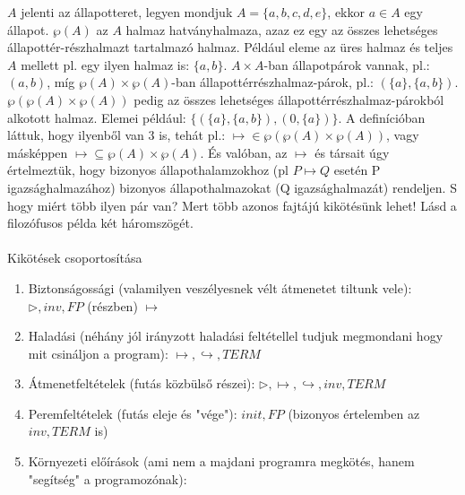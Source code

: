\documentclass{article}
\begin{document}
$A$ jelenti az állapotteret, legyen mondjuk $A = \lbrace a,b,c,d,e \rbrace$, ekkor $a \in A$ egy állapot. $\wp(A)$ az $A$ halmaz hatványhalmaza, azaz ez egy az összes lehetséges állapottér-részhalmazt tartalmazó halmaz. Például eleme az üres halmaz és teljes $A$ mellett pl. egy ilyen halmaz is: $ \lbrace a,b \rbrace$. $A \times A$-ban állapotpárok vannak, pl.: $(a,b)$, míg $\wp(A) \times \wp(A)$-ban állapottérrészhalmaz-párok, pl.: $(\lbrace a \rbrace, \lbrace a,b \rbrace)$. $\wp(\wp(A) \times \wp(A))$ pedig az összes lehetséges állapottérrészhalmaz-párokból alkotott halmaz. Elemei például: $\lbrace ( \lbrace a \rbrace, \lbrace a,b \rbrace), (0, \lbrace a \rbrace) \rbrace$. A definícióban láttuk, hogy ilyenből van 3 is, tehát pl.: $\mapsto \in \wp(\wp(A) \times \wp(A))$, vagy másképpen $\mapsto \subseteq \wp(A) \times \wp(A)$. És valóban, az $\mapsto$ és társait úgy értelmeztük, hogy bizonyos állapothalamzokhoz (pl $P \mapsto Q$ esetén P igazsághalmazához) bizonyos állapothalmazokat (Q igazsághalmazát) rendeljen. S hogy miért több ilyen pár van? Mert több azonos fajtájú kikötésünk lehet! Lásd a filozófusos példa két háromszögét.
\\\\
Kikötések csoportosítása
\begin{enumerate}
\item Biztonságossági (valamilyen veszélyesnek vélt átmenetet tiltunk vele): $\triangleright, inv, FP$ (részben) $\mapsto $
\item Haladási (néhány jól irányzott haladási feltétellel tudjuk megmondani hogy mit csináljon a program): $\mapsto, \hookrightarrow, TERM$
\item Átmenetfeltételek (futás közbülső részei): $\triangleright, \mapsto, \hookrightarrow, inv, TERM$
\item Peremfeltételek (futás eleje és "vége"): $init, FP $ (bizonyos értelemben az $inv, TERM$ is)
\item Környezeti előírások (ami nem a majdani programra megkötés, hanem "segítség" a programozónak):
\end{enumerate}
\end{document}
